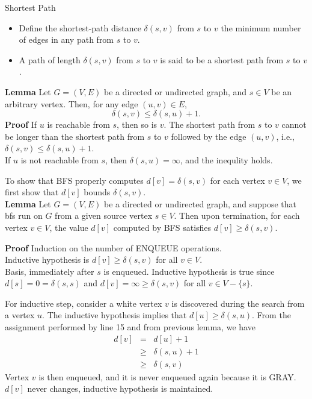 \documentclass{beamer}
\begin{document}
\begin{frame}{Shortest Path}

\begin{itemize}
\item Define the shortest-path distance $\delta(s,v)$ from $s$ to $v$ the
 minimum number of edges in any path from $s$ to $v$.  
\item A path of length $\delta(s,v)$ from $s$ to $v$
 is said to be a shortest path from $s$ to $v$.  
\end{itemize}
\end{frame}

\begin{frame}{}

{\bf Lemma} Let $G=(V,E)$ be a directed or undirected graph, and 
 $s\in V$ be an arbitrary vertex.  Then, for any edge $(u,v)\in E$,
$$\delta(s,v)\le \delta(s,u)+1.$$  
{\bf Proof} If $u$ is reachable from $s$, then so is $v$.  The shortest path
from $s$ to $v$ cannot be longer than the shortest path from $s$ to $v$
followed by the edge $(u,v)$, i.e., $\delta(s,v)\le \delta(s,u)+1$.  \\
If $u$ is not reachable from $s$, then $\delta(s,u)=\infty$, and the
 inequlity holds.  
\end{frame}

\begin{frame}{}

To show that BFS properly computes $d[v]=\delta(s,v)$ for each
vertex $v\in V$, we first show that $d[v]$ bounds $\delta(s,v)$.\\ 
{\bf Lemma} Let $G=(V,E)$ be a directed or undirected graph, and suppose
that bfs run on $G$ from a given source vertex $s\in V$.  
Then upon termination, for each vertex $v\in V$, the value $d[v]$
 computed by BFS satisfies $d[v]\ge \delta(s,v)$.  
\end{frame}

\begin{frame}{}

{\bf Proof} Induction on the number of ENQUEUE operations.  \\
Inductive hypothesis is $d[v]\ge \delta(s,v)$ for all $v\in V$.  \\
Basis, immediately after $s$ is enqueued.  Inductive hypothesis is true
since $d[s]=0=\delta(s,s)$ and $d[v]=\infty \ge \delta(s,v)$ for all 
$v\in V-\{s\}$.  \\
\end{frame}

\begin{frame}{}

For inductive step, consider a white vertex $v$ is discovered during the
search from a vertex $u$.  The inductive hypothesis implies that $d[u]\ge 
\delta(s,u)$.  From the assignment performed by line 15 and from 
previous lemma, we have
\begin{eqnarray*}
d[v] &=& d[u] +1 \\
 &\ge& \delta(s,u) +1 \\
 &\ge& \delta(s,v)
\end{eqnarray*}
Vertex $v$ is then enqueued, and it is never enqueued again because it is GRAY.
$d[v]$ never changes, inductive hypothesis is maintained.  
\end{frame}
\end{document}
